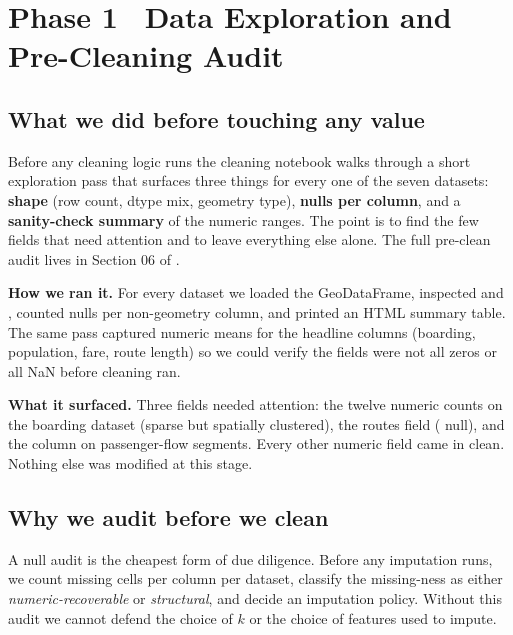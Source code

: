 
\section{Phase 1 \textbullet\ Data Exploration and Pre-Cleaning Audit}
\label{sec:phase1-nulls}

\subsection{What we did before touching any value}

Before any cleaning logic runs the cleaning notebook walks through a
short exploration pass that surfaces three things for every one of the
seven datasets: \textbf{shape} (row count, dtype mix, geometry type),
\textbf{nulls per column}, and a \textbf{sanity-check summary} of the
numeric ranges. The point is to find the few fields that need attention
and to leave everything else alone. The full pre-clean audit lives in
Section 06 of .

\textbf{How we ran it.} For every dataset we loaded the GeoDataFrame,
inspected  and ,
counted nulls per non-geometry column, and printed an HTML summary
table. The same pass captured numeric means for the headline columns
(boarding, population, fare, route length) so we could verify the
fields were not all zeros or all NaN before cleaning ran.

\textbf{What it surfaced.} Three fields needed attention: the
twelve numeric counts on the boarding dataset (sparse but spatially
clustered), the routes  field ( null), and the
 column on passenger-flow segments. Every
other numeric field came in clean. Nothing else was modified at this
stage.

\subsection{Why we audit before we clean}

A null audit is the cheapest form of due diligence. Before any imputation
runs, we count missing cells per column per dataset, classify the
missing-ness as either \emph{numeric-recoverable} or \emph{structural},
and decide an imputation policy. Without this audit we cannot defend
the choice of $k$ or the choice of features used to impute.

